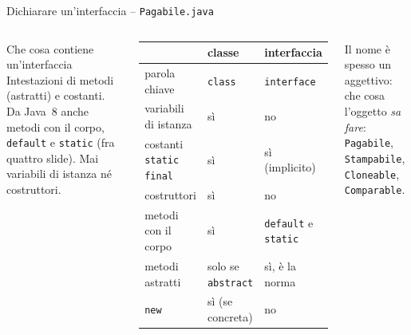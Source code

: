 \documentclass[10pt,aspectratio=169]{beamer}
\begin{document}
\begin{frame}[fragile]{Dichiarare un'interfaccia -- \texttt{Pagabile.java}}
\begin{columns}[T]
\begin{block}{Che cosa contiene un'interfaccia}
\small Intestazioni di metodi (astratti) e costanti. Da Java~8 anche metodi con il corpo, \texttt{default} e \texttt{static} (fra quattro slide). Mai variabili di istanza né costruttori.
\end{block}
\footnotesize
\begin{center}
\renewcommand{\arraystretch}{1.2}\setlength{\tabcolsep}{4pt}
\scriptsize
\begin{tabular}{@{}lll@{}}
\toprule
 & \textbf{classe} & \textbf{interfaccia} \\
\midrule
parola chiave & \texttt{class} & \texttt{interface} \\
variabili di istanza & sì & no \\
costanti \texttt{static final} & sì & sì (implicito) \\
costruttori & sì & no \\
metodi con il corpo & sì & \texttt{default} e \texttt{static} \\
metodi astratti & solo se \texttt{abstract} & sì, è la norma \\
\texttt{new} & sì (se concreta) & no \\
\bottomrule
\end{tabular}
\end{center}
\vspace{0.1cm}
Il nome è spesso un aggettivo: che cosa l'oggetto \emph{sa fare}: \texttt{Pagabile}, \texttt{Stampabile}, \texttt{Cloneable}, \texttt{Comparable}.
\end{columns}
\end{frame}
\end{document}
